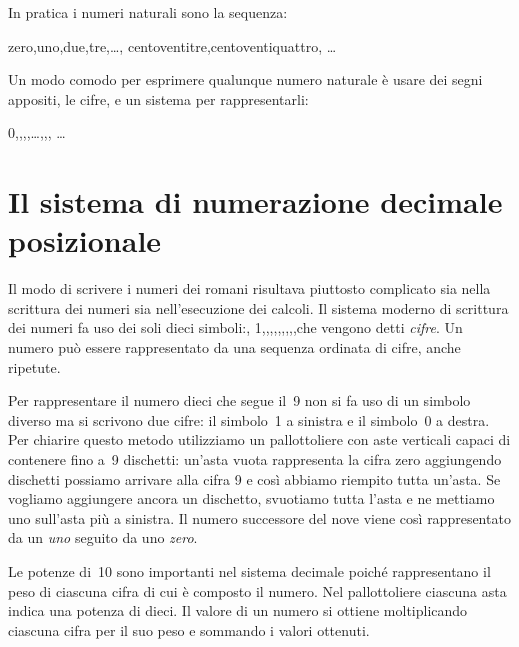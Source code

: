 In pratica i numeri naturali sono la sequenza:

zero,\quad uno,\quad due,\quad tre,\quad \dots,\quad
centoventitre,\quad centoventiquattro,\quad 
\dots

Un modo comodo per esprimere qualunque numero naturale è usare dei segni 
appositi, le cifre, e un sistema per rappresentarli:

 0,,,,\quad \dots,,, \dots

\section{Il sistema di numerazione decimale posizionale}
\label{sec:nat_sist10}

Il modo di scrivere i numeri dei romani risultava piuttosto complicato sia 
nella scrittura dei numeri sia nell'esecuzione dei calcoli. 
Il sistema moderno di scrittura dei numeri fa uso dei soli dieci 
simboli:\quad, 1,,,,,,,,,\quad che vengono detti \emph{cifre}.
Un numero può essere rappresentato da una sequenza ordinata di cifre, 
anche ripetute.

Per rappresentare il numero dieci che segue il~9 non si fa uso di un 
simbolo diverso ma si scrivono due cifre: il simbolo~1 a sinistra e il 
simbolo~0 a destra. 
Per chiarire questo metodo utilizziamo un pallottoliere con aste 
verticali capaci di contenere fino a~9 dischetti: 
un'asta vuota rappresenta la cifra zero aggiungendo dischetti possiamo 
arrivare alla cifra 9 e così abbiamo riempito tutta un'asta. 
Se vogliamo aggiungere ancora un dischetto, svuotiamo tutta l'asta e ne 
mettiamo uno sull'asta più a sinistra.
Il numero successore del nove viene così rappresentato da un \emph{uno} 
seguito da uno \emph{zero}.


Le potenze di~10 sono importanti nel sistema decimale poiché rappresentano 
il peso di ciascuna cifra di cui è composto il numero. 
Nel pallottoliere ciascuna asta indica una potenza di dieci. 
Il valore di un numero si ottiene moltiplicando ciascuna cifra per il
suo peso e sommando i valori ottenuti.

